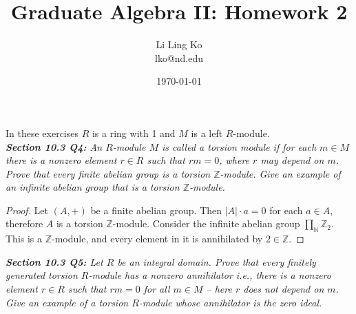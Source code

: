 \documentclass{article}
\begin{document}
\title{Graduate Algebra II: Homework 2}
\author{Li Ling Ko\\ lko@nd.edu}
\date{\today}
\maketitle

In these exercises $R$ is a ring with 1 and $M$ is a left $R$-module. \\

\it \textbf{Section 10.3 Q4:} An $R$-module $M$ is called a torsion module
  if for each $m\in M$ there is a nonzero element $r\in R$ such that
  $rm=0$, where $r$ may depend on $m$. Prove that every finite abelian
  group is a torsion $\mathbb{Z}$-module. Give an example of an infinite
  abelian group that is a torsion $\mathbb{Z}$-module.

  \begin{proof}
    Let $(A,+)$ be a finite abelian group. Then $|A|\cdot a=0$ for each
    $a\in A$, therefore $A$ is a torsion $\mathbb{Z}$-module. Consider the
    infinite abelian group $\prod_{\mathbb{N}}\mathbb{Z}_2$. This is a
    $\mathbb{Z}$-module, and every element in it is annihilated by
    $2\in\mathbb{Z}$.
  \end{proof}

\it \textbf{Section 10.3 Q5:} Let $R$ be an integral domain. Prove that
  every finitely generated torsion $R$-module has a nonzero annihilator
  i.e., there is a nonzero element $r\in R$ such that $rm=0$ for all $m\in
  M$ -- here $r$ does not depend on $m$. Give an example of a torsion
  $R$-module whose annihilator is the zero ideal.
\end{document}
